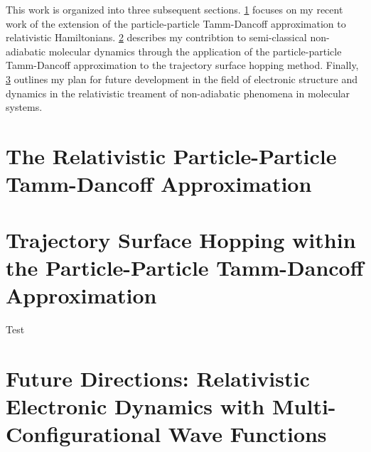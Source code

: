 \documentclass[12pt]{article}
\begin{document}
This work is organized into three subsequent sections.
\cref{sec:pp-X2C} focuses on my recent work of the extension of the
particle-particle Tamm-Dancoff approximation to relativistic Hamiltonians.
\cref{sec:pp-TSH} describes my contribtion to semi-classical non-adiabatic
molecular dynamics through the application of the particle-particle Tamm-Dancoff
approximation to the trajectory surface hopping method.  Finally,
\cref{sec:Future} outlines my plan for future development in the field of
electronic structure and dynamics in the relativistic treament of non-adiabatic
phenomena in molecular systems.


\section{The Relativistic Particle-Particle Tamm-Dancoff Approximation}
\label{sec:pp-X2C}


\section{Trajectory Surface Hopping within the Particle-Particle Tamm-Dancoff Approximation}
\label{sec:pp-TSH}
Test\cite{DBWY16_JCTC935,DBWY16_Accepted1,DBWY16_Submitted1,DBWY16_Submitted2}

\section{Future Directions: Relativistic Electronic Dynamics with Multi-Configurational Wave Functions}
\label{sec:Future}


\end{document}
